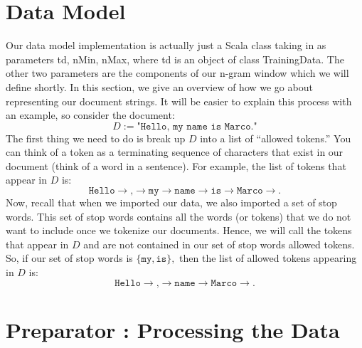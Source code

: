 \documentclass[a4paper,12pt]{article}
\renewcommand{\tt}[1]{\texttt{#1}}
\newcommand{\3}{\left}
\newcommand{\4}{\right}
\renewcommand{\-}[1]{{}^{-#1}}
\begin{document}
\section*{Data Model}

Our data model implementation is actually just a Scala class taking in as parameters td, nMin, nMax, where td is an object of class TrainingData. The other two parameters are the components of our n-gram window which we will define shortly. In this section, we give an overview of how we go about representing our document strings. It will be easier to explain this process with an example, so consider the document:
$$
D := \tt{"Hello, my name is Marco."}
$$
The first thing we need to do is break up $D$ into a list of \enquote{allowed tokens.} You can think of a token as a terminating sequence of characters that exist in our document (think of a word in a sentence). For example, the list of tokens that appear in $D$ is:
$$
\tt{Hello} \to \tt{,} \to \tt{my} \to \tt{name} \to \tt{is} \to \tt{Marco} \to \tt{.}
$$
Now, recall that when we imported our data, we also imported a set of stop words. This set of stop words contains all the words (or tokens) that we do not want to include once we tokenize our documents. Hence, we will call the tokens that appear in $D$ and are not contained in our set of stop words allowed tokens. So, if our set of stop words is $\{\tt{my}, \tt{is}\},$ then the list of allowed tokens appearing in $D$ is:
$$
\tt{Hello} \to \tt{,} \to \tt{name} \to \tt{Marco} \to \tt{.}
$$

\section*{Preparator : Processing the Data}
\end{document}
